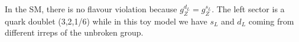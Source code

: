 \documentclass[../main.tex]{subfiles}
\begin{document}
\begin{kaobox}[frametitle=Toy model]
In the SM, there is no flavour violation because $g_Z^{d_L}=g_Z^{s_L}$. The left sector is a quark doublet (3,2,1/6) while in this toy model we have $s_L$ and $d_L$ coming from different irreps of the unbroken group.
\end{kaobox}
\newpage
\end{document}
